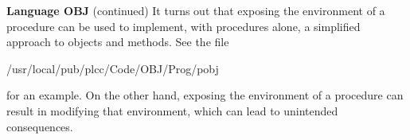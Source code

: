 \begin{minipage}[t]{\sw}
\slidenumber
\LARGE
{\bf Language OBJ} (continued)\exx
It turns out that exposing the environment of a procedure
can be used to implement, with procedures alone,
a simplified approach to objects and methods.
See the file
\begin{qv}
/usr/local/pub/plcc/Code/OBJ/Prog/pobj
\end{qv}
for an example.
On the other hand, exposing the environment of a procedure
can result in modifying that environment,
which can lead to unintended consequences.
\end{minipage}
